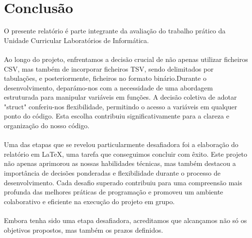 \documentclass[a4wide]{report}
\begin{document}
\chapter{Conclusão}
O presente relatório é parte integrante da avaliação do trabalho prático da Unidade Curricular Laboratórios de Informática.
\\
\\
Ao longo do projeto, enfrentamos a decisão crucial de não apenas utilizar ficheiros CSV, mas também de incorporar ficheiros TSV, sendo delimitados por tabulações, e posteriormente, ficheiros no formato binário.Durante o desenvolvimento, deparámo-nos com a necessidade de uma abordagem estruturada para manipular variáveis em funções. A decisão coletiva de adotar "struct" conferiu-nos flexibilidade, permitindo o acesso a variáveis em qualquer ponto do código. Esta escolha contribuiu significativamente para a clareza e organização do nosso código.
\\
\\
Uma das etapas que se revelou particularmente desafiadora foi a elaboração do relatório em LaTeX, uma tarefa que conseguimos concluir com êxito.
Este projeto não apenas aprimorou as nossas habilidades técnicas, mas também destacou a importância de decisões ponderadas e flexibilidade durante o processo de desenvolvimento. Cada desafio superado contribuiu para uma compreensão mais profunda das melhores práticas de programação e promoveu um ambiente colaborativo e eficiente na execução do projeto em grupo.
\\
\\
Embora tenha sido uma etapa desafiadora, acreditamos que alcançamos não só os objetivos propostos, mas também os prazos definidos.
\\


\end{document}
